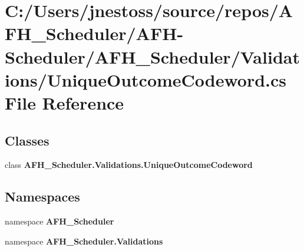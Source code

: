 \section{C\+:/\+Users/jnestoss/source/repos/\+A\+F\+H\+\_\+\+Scheduler/\+A\+F\+H-\/\+Scheduler/\+A\+F\+H\+\_\+\+Scheduler/\+Validations/\+Unique\+Outcome\+Codeword.cs File Reference}
\label{_unique_outcome_codeword_8cs}
\subsection*{Classes}
\begin{DoxyCompactItemize}
\item 
class \textbf{ A\+F\+H\+\_\+\+Scheduler.\+Validations.\+Unique\+Outcome\+Codeword}
\end{DoxyCompactItemize}
\subsection*{Namespaces}
\begin{DoxyCompactItemize}
\item 
namespace \textbf{ A\+F\+H\+\_\+\+Scheduler}
\item 
namespace \textbf{ A\+F\+H\+\_\+\+Scheduler.\+Validations}
\end{DoxyCompactItemize}
